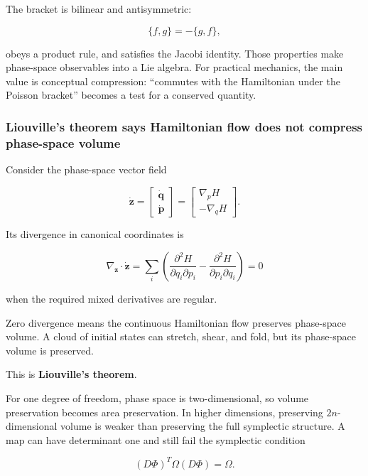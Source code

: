 The bracket is bilinear and antisymmetric:

\[
\{f,g\}=-\{g,f\},
\]

obeys a product rule, and satisfies the Jacobi identity. Those properties make phase-space observables into a Lie algebra. For practical mechanics, the main value is conceptual compression: ``commutes with the Hamiltonian under the Poisson bracket'' becomes a test for a conserved quantity.

\subsubsection{Liouville's theorem says Hamiltonian flow does not compress phase-space volume}\label{02-foundations-ii-ch025-liouvilles-theorem-says-hamiltonian-flow-does-not-compress-phase-space-volume}

\hypertarget{02-foundations-ii-ch025-liouvilles-theorem-says-hamiltonian-flow-does-not-compress-phase-space-volume}{}

Consider the phase-space vector field

\[
\dot{\mathbf z}
=
\begin{bmatrix}
\dot{\mathbf q}\\
\dot{\mathbf p}
\end{bmatrix}
=
\begin{bmatrix}
\nabla_pH\\
-\nabla_qH
\end{bmatrix}.
\]

Its divergence in canonical coordinates is

\[
\nabla_{\mathbf z}\cdot\dot{\mathbf z}
=
\sum_i
\left(
\frac{\partial^2H}{\partial q_i\partial p_i}
-
\frac{\partial^2H}{\partial p_i\partial q_i}
\right)
=0
\]

when the required mixed derivatives are regular.

Zero divergence means the continuous Hamiltonian flow preserves phase-space volume. A cloud of initial states can stretch, shear, and fold, but its phase-space volume is preserved.

This is \textbf{Liouville's theorem}.

For one degree of freedom, phase space is two-dimensional, so volume preservation becomes area preservation. In higher dimensions, preserving \(2n\)-dimensional volume is weaker than preserving the full symplectic structure. A map can have determinant one and still fail the symplectic condition

\[
(D\Phi)^T\Omega(D\Phi)=\Omega.
\]

